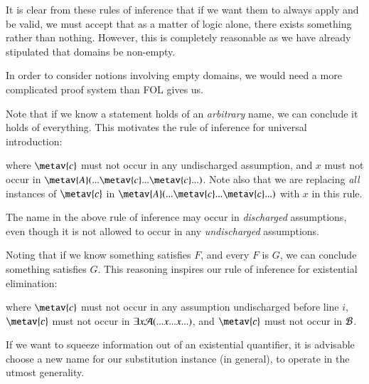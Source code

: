 \begin{remark}
    It is clear from these rules of inference that if we want them to always apply and be valid, we must accept that as a matter of logic alone, there exists something rather than nothing. However, this is completely reasonable as we have already stipulated that domains be non-empty.

    In order to consider notions involving empty domains, we would need a more complicated proof system than FOL gives us.
\end{remark}

\begin{definition}
    Note that if we know a statement holds of an \emph{arbitrary} name, we can conclude it holds of everything. This motivates the rule of inference for universal introduction: 
    \begin{fitchproof}
         
    \end{fitchproof}
    where $\metav{c}$ must not occur in any undischarged assumption, and $x$ must not occur in $\metav{A}(...\metav{c}...\metav{c}...)$. Note also that we are replacing \emph{all} instances of $\metav{c}$ in $\metav{A}(...\metav{c}...\metav{c}...)$ with $x$ in this rule.
\end{definition}

The name in the above rule of inference may occur in \emph{discharged} assumptions, even though it is not allowed to occur in any \emph{undischarged} assumptions.



\begin{definition}
    Noting that if we know something satisfies $F$, and every $F$ is $G$, we can conclude something satisfies $G$. This reasoning inspires our rule of inference for existential elimination: 
    \begin{fitchproof}
        \open
        \close
         
    \end{fitchproof}
    where $\metav{c}$ must not occur in any assumption undischarged before line $i$, $\metav{c}$ must not occur in $\exists x\mathcal{A}(...x...x...)$, and $\metav{c}$ must not occur in $\mathcal{B}$.
\end{definition}

If we want to squeeze information out of an existential quantifier, it is advisable choose a new name for our substitution instance (in general), to operate in the utmost generality.


